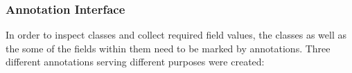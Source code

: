 %
%
%
%
%
%
%
%

\subsubsection{Annotation Interface}

In order to inspect classes and collect required field values, the classes as well as the some of the fields within them need to be marked by annotations.
Three different annotations serving different purposes were created:

